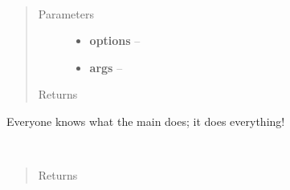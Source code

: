 \documentclass[letterpaper,10pt,english]{sphinxmanual}
\begin{document}

\begin{fulllineitems}
\label{index:aietes.go}~\begin{quote}\begin{description}
\item[{Parameters}] \leavevmode\begin{itemize}
\item {} 
\textbf{options} -- 

\item {} 
\textbf{args} -- 

\end{itemize}

\item[{Returns}] \leavevmode


\end{description}\end{quote}

\end{fulllineitems}


\begin{fulllineitems}
\label{index:aietes.main}
Everyone knows what the main does; it does everything!

\end{fulllineitems}


\begin{fulllineitems}
\label{index:aietes.option_parser}~\begin{quote}\begin{description}
\item[{Returns}] \leavevmode


\end{description}\end{quote}

\end{fulllineitems}
\end{document}
